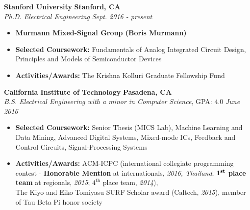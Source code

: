 \documentclass{article}
\newenvironment{changemargin}[2]{%
  \begin{list}{}{%
    \setlength{\topsep}{0pt}%
    \setlength{\leftmargin}{#1}%
    \setlength{\rightmargin}{#2}%
    \setlength{\listparindent}{\parindent}%
    \setlength{\itemindent}{\parindent}%
    \setlength{\parsep}{\parskip}%
  }%
  \item[]}{\end{list}
}
\newenvironment{body} {
	\vspace*{-16pt}
	\begin{changemargin}{-0.25in}{-0.5in}
  }	
	{\end{changemargin}
}
\begin{document}
\begin{body}
	\vspace{14pt}
	\textbf{Stanford University} \hfill \textbf{Stanford, CA} \\
	\emph{Ph.D. Electrical Engineering} \hfill \emph{Sept. 2016 - present} \\
	\begin{itemize}
	\item \textbf{Murmann Mixed-Signal Group (Boris Murmann)} \\
	\item \textbf{Selected Coursework:} Fundamentals of Analog Integrated Circuit Design, Principles and Models of Semiconductor Devices
	\item \textbf{Activities/Awards:} The Krishna Kolluri Graduate Fellowship Fund
	\end{itemize}

	\smallskip

	\textbf{California Institute of Technology} \hfill \textbf{Pasadena, CA} \\
	\emph{B.S. Electrical Engineering with a minor in Computer Science}, GPA: $4.0$ \hfill \emph{June 2016} \\
	\begin{itemize}
	\item \textbf{Selected Coursework:} Senior Thesis (MICS Lab), Machine Learning and Data Mining, Advanced Digital Systems, Mixed-mode ICs, Feedback and Control Circuits, Signal-Processing Systems
	\item \textbf{Activities/Awards:} ACM-ICPC (international collegiate programming contest - \textbf{Honorable Mention} at internationals, \textit{2016, Thailand}; $\boldsymbol{1}^\text{\textbf{st}}$ \textbf{place team} at regionals, \textit{2015}; $4^\text{th}$ place team, \textit{2014}),\\The Kiyo and Eiko Tomiyasu SURF Scholar award (Caltech, \textit{2015}), member of Tau Beta Pi honor society
	\end{itemize}


\end{body}
\end{document}
